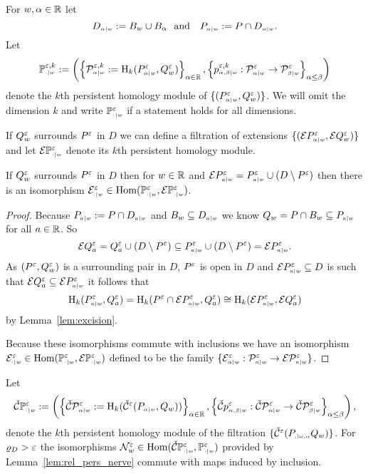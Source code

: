 For $w,\alpha\in\R$ let
\[ D\subi{w}{\alpha} := B_w\cup B_\alpha\ \text{ and }\ \ P\subi{w}{\alpha} := P\cap D\subi{w}{\alpha}.\]
Let
\[\PP{w}{\e,k} := \left(\left\{\P{w}{\e,k}{\alpha} := \hom_k(P\subi{w}{\alpha}^\e,Q_w^\e)\right\}_{\alpha\in\R}, \left\{p\subi{w}{\alpha,\beta}^{\e,k} : \P{w}{\e}{\alpha}\to\P{w}{\e}{\beta}\right\}_{\alpha\leq\beta}\right)\]
denote the $k$th persistent homology module of $\{(P\subi{w}{\alpha}^\e,Q_w^\e)\}$.
We will omit the dimension $k$ and write $\PP{w}{\e}$ if a statement holds for all dimensions.

If $Q_w^\e$ surrounds $P^\e$ in $D$ we can define a filtration of extensions $\{(\ext{P\subi{w}{\alpha}^\e},\ext{Q_w^\e})\}$ and let $\ext{\PP{w}{\e}}$ denote its $k$th persistent homology module.

\begin{lemma}\label{lem:extension_apply}
  If $Q_w^\e$ surrounds $P^\e$ in $D$ then for $w\in\R$ and $\ext{P\subi{w}{a}^\e} = P\subi{w}{a}^\e \cup (D\setminus P^\e)$ then there is an isomorphism $\E\subi{w}{\cdot}^\e \in \Hom(\PP{w}{\e},\ext{\PP{w}{\e}})$.
\end{lemma}
\begin{proof}
  Because $P\subi{w}{a} := P\cap D\subi{w}{a}$ and $B_w\subseteq D\subi{w}{a}$ we know $Q_w = P\cap B_w \subseteq P\subi{w}{a}$ for all $a\in\R$.
  So
  \[\ext{Q^\e_a} = Q^\e_a\cup (D\setminus P^\e) \subseteq P\subi{w}{a}^\e \cup (D\setminus P^\e) = \ext{P\subi{w}{a}^\e}.\]
  As $(P^\e, Q_w^\e)$ is a surrounding pair in $D$, $P^\e$ is open in $D$ and $\ext{P\subi{w}{a}^\e}\subseteq D$ is such that $\ext{Q^\e_a}\subseteq \ext{P\subi{w}{a}^\e}$ it follows that
  \[\hom_k(P\subi{w}{a}^\e, Q^\e_a) = \hom_k(P^\e\cap \ext{P\subi{w}{a}^\e}, Q^\e_a) \cong\hom_k(\ext{P\subi{w}{a}^\e}, \ext{Q^\e_a})\]
  by Lemma~\ref{lem:excision}.

  Because these isomorphisms commute with inclusions we have an isomorphism $\E\subi{w}{\cdot}^\e \in \Hom(\PP{w}{\e},\ext{\PP{w}{\e}})$ defined to be the family $\{\E\subi{w}{\alpha}^\e : \P{w}{\e}{a}\to \E\P{w}{\e}{a}\}$.
\end{proof}

Let
\[\CPP{w}{\e} := \left(\left\{\CP{w}{\e}{\alpha} := \hom_k(\cech^\e(P\subi{w}{\alpha}, Q_w))\right\}_{\alpha\in\R}, \left\{\cech p\subi{w}{\alpha,\beta}^\e : \CP{w}{\e}{\alpha}\to\CP{w}{\e}{\beta}\right\}_{\alpha\leq\beta}\right),\]
denote the $k$th persistent homology module of the \Cech filtration $\{\cech^\e(P\subi{\omega,\alpha}, Q_w)\}$.
For $\varrho_D > \e$ the isomorphisms $\N_w^\e\in\Hom(\CPP{w}{\e}, \PP{w}{\e})$ provided by Lemma~\ref{lem:rel_pers_nerve} commute with maps induced by inclusion.

